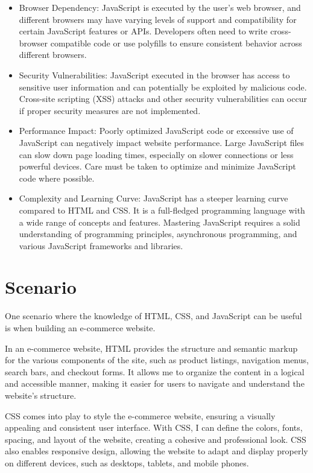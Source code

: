 \documentclass{article}
\begin{document}
\begin{itemize}
\item	Browser Dependency: JavaScript is executed by the user's web browser, and different browsers may have varying levels of support and compatibility for certain JavaScript features or APIs. Developers often need to write cross-browser compatible code or use polyfills to ensure consistent behavior across different browsers.
\item	Security Vulnerabilities: JavaScript executed in the browser has access to sensitive user information and can potentially be exploited by malicious code. Cross-site scripting (XSS) attacks and other security vulnerabilities can occur if proper security measures are not implemented.
\item	Performance Impact: Poorly optimized JavaScript code or excessive use of JavaScript can negatively impact website performance. Large JavaScript files can slow down page loading times, especially on slower connections or less powerful devices. Care must be taken to optimize and minimize JavaScript code where possible.
\item	Complexity and Learning Curve: JavaScript has a steeper learning curve compared to HTML and CSS. It is a full-fledged programming language with a wide range of concepts and features. Mastering JavaScript requires a solid understanding of programming principles, asynchronous programming, and various JavaScript frameworks and libraries.
\end{itemize}

\section{Scenario}

One scenario where the knowledge of HTML, CSS, and JavaScript can be useful is when building an e-commerce website.


In an e-commerce website, HTML provides the structure and semantic markup for the various components of the site, such as product listings, navigation menus, search bars, and checkout forms. It allows me to organize the content in a logical and accessible manner, making it easier for users to navigate and understand the website's structure.

CSS comes into play to style the e-commerce website, ensuring a visually appealing and consistent user interface. With CSS, I can define the colors, fonts, spacing, and layout of the website, creating a cohesive and professional look. CSS also enables responsive design, allowing the website to adapt and display properly on different devices, such as desktops, tablets, and mobile phones.
\end{document}
